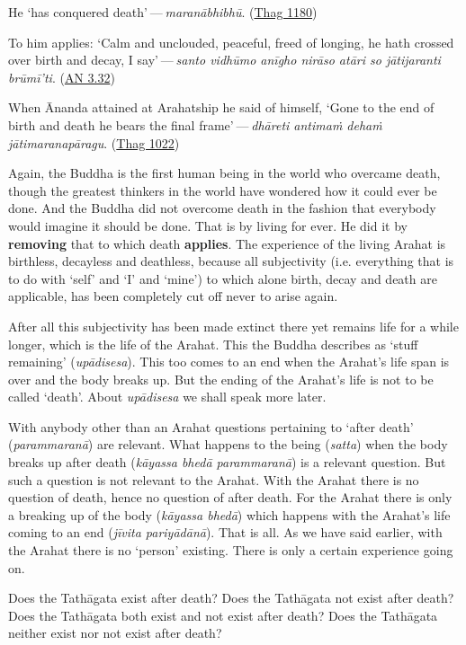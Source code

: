 He `has conquered death' --- \emph{maranābhibhū}. (\href{https://suttacentral.net/thag20.1/en/sujato}{Thag 1180})

To him applies: `Calm and unclouded, peaceful, freed of longing, he hath crossed over birth and decay, I say' --- \emph{santo vidhūmo anīgho nirāso atāri so jātijaranti brūmī'ti}. (\href{https://suttacentral.net/an3.32/en/bodhi}{AN 3.32})

When Ānanda attained at Arahatship he said of himself, `Gone to the end of birth and death he bears the final frame' --- \emph{dhāreti antimaṁ dehaṁ jātimaranapāragu}. (\href{https://suttacentral.net/thag17.3/en/sujato}{Thag 1022})

Again, the Buddha is the first human being in the world who overcame death, though the greatest thinkers in the world have wondered how it could ever be done. And the Buddha did not overcome death in the fashion that everybody would imagine it should be done. That is by living for ever. He did it by \textbf{removing} that to which death \textbf{applies}. The experience of the living Arahat is birthless, decayless and deathless, because all subjectivity (i.e. everything that is to do with `self' and `I' and `mine') to which alone birth, decay and death are applicable, has been completely cut off never to arise again.

After all this subjectivity has been made extinct there yet remains life for a while longer, which is the life of the Arahat. This the Buddha describes as `stuff remaining' (\emph{upādisesa}). This too comes to an end when the Arahat's life span is over and the body breaks up. But the ending of the Arahat's life is not to be called `death'. About \emph{upādisesa} we shall speak more later.

With anybody other than an Arahat questions pertaining to `after death' (\emph{parammaranā}) are relevant. What happens to the being (\emph{satta}) when the body breaks up after death (\emph{kāyassa bhedā parammaranā}) is a relevant question. But such a question is not relevant to the Arahat. With the Arahat there is no question of death, hence no question of after death. For the Arahat there is only a breaking up of the body (\emph{kāyassa bhedā}) which happens with the Arahat's life coming to an end (\emph{jīvita pariyādānā}). That is all. As we have said earlier, with the Arahat there is no `person' existing. There is only a certain experience going on.

Does the Tathāgata exist after death? Does the Tathāgata not exist after death? Does the Tathāgata both exist and not exist after death? Does the Tathāgata neither exist nor not exist after death?

